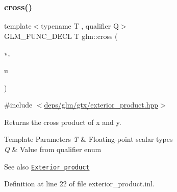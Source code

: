 \subsubsection{\texorpdfstring{cross()}{cross()}}
{\footnotesize\ttfamily template$<$typename T , qualifier Q$>$ \\
G\+L\+M\+\_\+\+F\+U\+N\+C\+\_\+\+D\+E\+CL T glm\+::cross (\begin{DoxyParamCaption}\item[{\hyperlink{structglm_1_1vec}{vec}$<$ 2, T, Q $>$ const \&}]{v,  }\item[{\hyperlink{structglm_1_1vec}{vec}$<$ 2, T, Q $>$ const \&}]{u }\end{DoxyParamCaption})}



{\ttfamily \#include $<$\hyperlink{exterior__product_8hpp}{deps/glm/gtx/exterior\+\_\+product.\+hpp}$>$}

Returns the cross product of x and y.


\begin{DoxyTemplParams}{Template Parameters}
{\em T} & Floating-\/point scalar types \\
\hline
{\em Q} & Value from qualifier enum\\
\hline
\end{DoxyTemplParams}
\begin{DoxySeeAlso}{See also}
\href{https://en.wikipedia.org/wiki/Exterior_algebra#Cross_and_triple_products}{\tt Exterior product} 
\end{DoxySeeAlso}


Definition at line 22 of file exterior\+\_\+product.\+inl.

